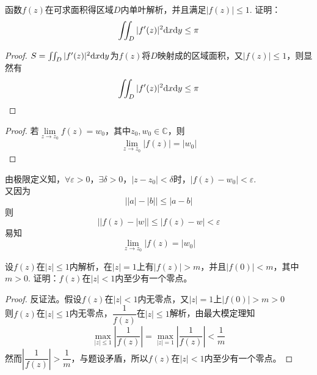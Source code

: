 \begin{proposition}
    
    函数$f(z)$在可求面积得区域$D$内单叶解析，并且满足$|f(z)| \leq 1$. 证明：
    \[\iint_{D}{|f'(z)|^2}\mathrm{d} x\mathrm{d} y \leq  \pi\]

\end{proposition}

\begin{proof}
    
    $S = \iint_{D}{|f'(z)|^2}\mathrm{d} x\mathrm{d} y$为$f(z)$将$D$映射成的区域面积，又$|f(z)| \leq 1$，则显然有
    \[\iint_{D}{|f'(z)|^2}\mathrm{d} x\mathrm{d} y \leq  \pi\]

\end{proof}

\begin{proof}
    
    若$\lim\limits_{z \to z_0}{f(z)} = w_0$，其中$z_0, w_0 \in \mathbb{C}$，则
    \[\lim\limits_{z \to z_0}{|f(z)|} = |w_0|\]

\end{proof}

\begin{proposition}
    
    由极限定义知，$\forall \varepsilon > 0$，$\exists \delta > 0$，$|z - z_0| < \delta$时，$|f(z) - w_0 | < \varepsilon$. \\
    又因为
    \[\Big||a| - |b|\Big| \leq |a - b|\]
    则 
    \[\Big| |f(z) - |w| \Big| \leq | f(z) - w| < \varepsilon \]
    易知
    \[\lim\limits_{z \to z_0}{|f(z)} = |w_0|\]

\end{proposition}

\begin{proposition}
    
    设$f(z)$在$|z| \leq 1$内解析，在$|z| = 1$上有$|f(z)| > m$，并且$|f(0)| < m$，其中$m > 0$. 证明：$f(z)$在$|z| < 1$内至少有一个零点。

\end{proposition}

\begin{proof}
    
    反证法。假设$f(z)$在$|z| < 1$内无零点，又$|z| = 1$上$|f(0)| > m > 0$ \\
    则$f(z)$在$|z| \leq 1$内无零点，$\dfrac{1}{f(z)}$在$|z| \leq 1$解析，由最大模定理知
    \[\max_{|z| \leq 1}{\left| \dfrac{1}{f(z)} \right|} = \max_{|z| = 1}{\left| \dfrac{1}{f(z)} \right|}  < \dfrac{1}{m}\]
    然而$\left| \dfrac{1}{f(z)} \right| > \dfrac{1}{m}$，与题设矛盾，所以$f(z)$在$|z| < 1$内至少有一个零点。

\end{proof}

